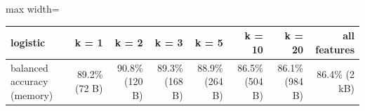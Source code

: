 \begin{adjustbox}{max width=\textwidth}
{\scriptsize
\begin{tabular}{lrrrrrrr}
\toprule
\textbf{logistic} & \textbf{k = 1} & \textbf{k = 2} & \textbf{k = 3} & \textbf{k = 5} & \textbf{k = 10} & \textbf{k = 20} & \textbf{all features} \\
\midrule
balanced accuracy (memory) & 89.2\% (72 B) & 90.8\% (120 B) & 89.3\% (168 B) & 88.9\% (264 B) & 86.5\% (504 B) & 86.1\% (984 B) & 86.4\% (2 kB) \\
\bottomrule
\end{tabular}
}
\end{adjustbox}
